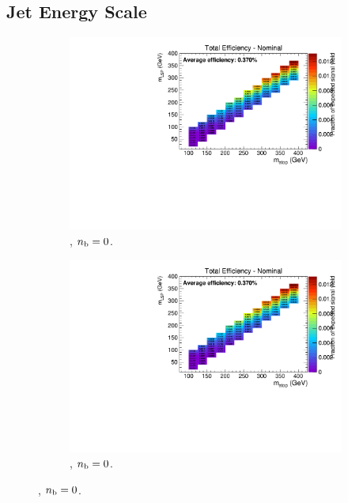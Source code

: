 \newpage
\subsection*{Jet Energy Scale}
\label{sec:t2degen_jes_plots}

\begin{figure}[ht!]
  \centering
  \begin{subfigure}[b]{0.32\textwidth}
    \includegraphics[width=\textwidth, page=4]{Figs/sms/t2degen/v5/JES_T2_4body_v5_eq0b_le3j_incl.pdf}
    \caption{\njlow, $n_{\text{b}} = 0$.}
  \end{subfigure}
  \begin{subfigure}[b]{0.32\textwidth}
    \includegraphics[width=\textwidth, page=5]{Figs/sms/t2degen/v5/JES_T2_4body_v5_eq0b_le3j_incl.pdf}
    \caption{\njlow, $n_{\text{b}} = 0$.}
  \end{subfigure}

\end{figure}
